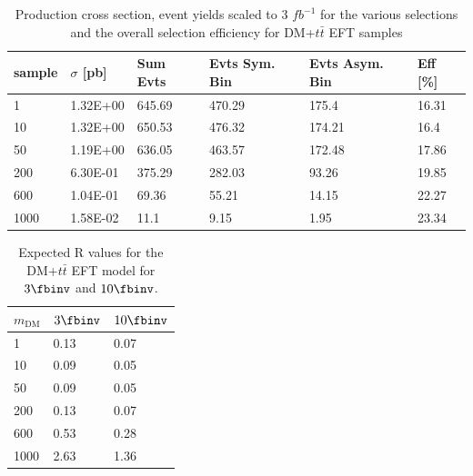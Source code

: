 \begin{table}[h]
\centering
\begin{tabular}{llllll}
\hline
sample             & $\sigma$ [pb] & Sum Evts       & Evts Sym. Bin & Evts Asym. Bin & Eff  [\%]   \\\hline
1    & 1.32E+00 & 645.69 & 470.29 & 175.4  & 16.31 \\
10   & 1.32E+00 & 650.53 & 476.32 & 174.21 & 16.4  \\
50   & 1.19E+00 & 636.05 & 463.57 & 172.48 & 17.86 \\
200  & 6.30E-01 & 375.29 & 282.03 & 93.26  & 19.85 \\
600  & 1.04E-01 & 69.36  & 55.21  & 14.15  & 22.27\\
1000 & 1.58E-02 & 11.1   & 9.15   & 1.95   & 23.34 \\
\hline
\end{tabular}
\caption{Production cross section, event yields scaled to 3 $fb^{-1 }$ for the various selections and the overall selection efficiency for DM+$t\bar{t}$ EFT samples}
\label{tab:dm_dmtt_EFT_g1}
\end{table}


\begin{table}[h]
\centering
\begin{tabular}{lll}\hline
$m_{\textrm{DM}}$& $3\fbinv$  & $10\fbinv$ \\\hline
1            & 0.13 & 0.07 \\
10           & 0.09 & 0.05 \\
50           & 0.09 & 0.05 \\
200          & 0.13 & 0.07 \\
600          & 0.53 & 0.28 \\
1000         & 2.63 & 1.36 \\
\hline
\end{tabular}
\caption{Expected R values for the DM+$t\bar{t}$ EFT model for $3\fbinv$ and $10\fbinv$.} 
\label{tab:dm_dmtt_eft_rvalues}
\end{table}


